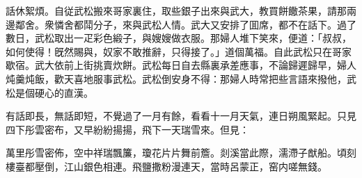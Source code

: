 話休絮煩。自従武松搬來哥家裏住，取些銀子出來與武大，教買餅饊茶果，請那兩邊鄰舍。衆憐舍都鬦分子，來與武松人情。武大又安排了囬席，都不在話下。過了數日，武松取出一疋彩色緞子，與嫂嫂做衣服。那婦人堆下笑來，便道：「叔叔，如何使得！旣然賜與，奴家不敢推辭，只得接了。」道個萬福。自此武松只在哥家歇宿。武大依前上街挑賣炊餅。武松每日自去縣裏承差應事，不論歸遲歸早，婦人炖羹炖飯，歡天喜地服事武松。武松倒安身不得：那婦人時常把些言語來撥他，武松是個硬心的直漢。

有話即長，無話即短，不覺過了一月有餘，看看十一月天氣，連日朔風緊起。只見四下彤雲密布，又早紛紛揚揚，飛下一天瑞雪來。但見：　

\begin{myquote}
萬里彤雪密佈，空中祥瑞飄簾，瓊花片片舞前簷。剡溪當此際，濡滯子猷船。頃刻樓臺都壓倒，江山銀色相連。飛鹽撒粉漫連天，當時呂蒙正，窑内嗟無錢。
\end{myquote}

